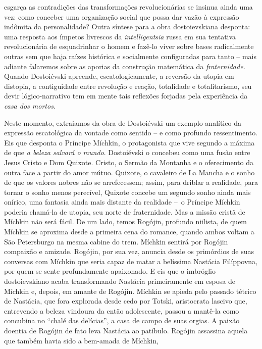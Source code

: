 esgarça as contradições das transformações revolucionárias se insinua
ainda uma vez: como conceber uma organização social que possa dar vazão
à expressão indômita da personalidade? Outra síntese para a obra
dostoievskiana desponta: uma resposta aos ímpetos livrescos da
\emph{intelligentsia} russa em sua tentativa revolucionária de
esquadrinhar o homem e fazê-lo viver sobre bases radicalmente outras sem
que haja raízes histórica e socialmente configuradas para tanto -- mais
adiante falaremos sobre as aporias da construção matemática da
\emph{fraternidade.} Quando Dostoiévski apreende, escatologicamente, a
reversão da utopia em distopia, a contiguidade entre revolução e reação,
totalidade e totalitarismo, seu devir lógico-narrativo tem em mente tais
reflexões forjadas pela experiência da \emph{casa dos mortos. }

Neste momento, extraiamos da obra de Dostoiévski um exemplo analítico da
expressão escatológica da vontade como sentido -- e como profundo
ressentimento. Eis que desponta o Príncipe Míchkin, o protagonista que
vive segundo a máxima de que \emph{a beleza salvará o mundo}.
Dostoiévski o concebeu como uma fusão entre Jesus Cristo e Dom Quixote.
Cristo, o Sermão da Montanha e o oferecimento da outra face a partir do
amor mútuo. Quixote, o cavaleiro de La Mancha e o sonho de que os
valores nobres não se arrefecessem; assim, para driblar a realidade,
para tornar o sonho menos perecível, Quixote concebe um segundo sonho
ainda mais onírico, uma fantasia ainda mais distante da realidade --~o
Príncipe Míchkin poderia chamá-la de utopia, seu norte de fraternidade.
Mas a missão cristã de Míchkin não será fácil. De um lado, temos
Rogójin, profundo niilista, de quem Míchkin se aproxima desde a primeira
cena do romance, quando ambos voltam a São Petersburgo na mesma cabine
do trem. Míchkin sentirá por Rogójin compaixão e amizade. Rogójin, por
sua vez, anuncia desde os primórdios de suas conversas com Míchkin que
seria capaz de matar a belíssima Nastácia Filíppovna, por quem se sente
profundamente apaixonado. E eis que o imbróglio dostoievskiano acaba
transformando Nastácia primeiramente em esposa de Míchkin e, depois, em
amante de Rogójin. Míchkin se apieda pelo passado tétrico de Nastácia,
que fora explorada desde cedo por Totski, aristocrata lascivo que,
entrevendo a beleza vindoura da então adolescente, passou a mantê-la
como concubina no ``chalé das delícias'', a casa de campo de suas
orgias. A paixão doentia de Rogójin de fato leva Nastácia ao patíbulo.
Rogójin assassina aquela que também havia sido a bem-amada de Míchkin,
